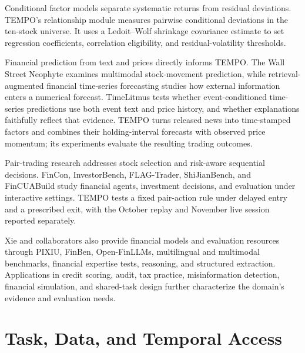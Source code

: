 \documentclass[conference]{IEEEtran}
\begin{document}
Conditional factor models separate systematic returns from residual deviations\cite{spears2023}. TEMPO's relationship module measures pairwise conditional deviations in the ten-stock universe. It uses a Ledoit--Wolf shrinkage covariance estimate\cite{ledoit2004} to set regression coefficients, correlation eligibility, and residual-volatility thresholds.

Financial prediction from text and prices directly informs TEMPO. The Wall Street Neophyte examines multimodal stock-movement prediction\cite{xie2023wallstreet}, while retrieval-augmented financial time-series forecasting studies how external information enters a numerical forecast\cite{xiao2025retrieval}. TimeLitmus tests whether event-conditioned time-series predictions use both event text and price history, and whether explanations faithfully reflect that evidence\cite{gong2026timelitmus}. TEMPO turns released news into time-stamped factors and combines their holding-interval forecasts with observed price momentum; its experiments evaluate the resulting trading outcomes.

Pair-trading research addresses stock selection and risk-aware sequential decisions\cite{han2023selecttrade,han2023riskpair}. FinCon, InvestorBench, FLAG-Trader, ShiJianBench, and FinCUABuild study financial agents, investment decisions, and evaluation under interactive settings\cite{yu2024fincon,li2025investorbench,xiong2025flagtrader,gong2026shijian,yang2026fincua}. TEMPO tests a fixed pair-action rule under delayed entry and a prescribed exit, with the October replay and November live session reported separately.

Xie and collaborators also provide financial models and evaluation resources through PIXIU, FinBen, Open-FinLLMs, multilingual and multimodal benchmarks, financial expertise tests, reasoning, and structured extraction\cite{xie2023pixiu,xie2024finben,xie2024openfinllms,hu2024nolang,peng2025multifinben,yang2025ucfe,lin2025leaderboard,qian2025fino1,cao2025finaudio,kuang2025scores,wang2025fintagging,zhang2024dolares,peng2025plutus}. Applications in credit scoring, audit, tax practice, misinformation detection, financial simulation, and shared-task design further characterize the domain's evidence and evaluation needs\cite{feng2023credit,huang2024auditwen,huang2026auditjudg,hu2026taxpraben,liu2025fmdllama,liu2025misinformation,liu2026simulation,xie2024agentScen}.

\section{Task, Data, and Temporal Access}
\end{document}
